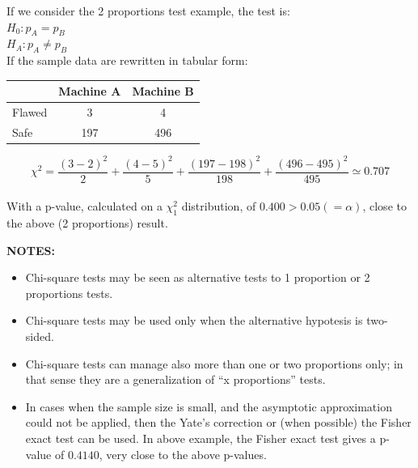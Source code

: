 \begin{frame}
  \vspace{.25cm}
  If we consider the 2 proportions test example, the test is:\\
  $H_0: p_A=p_B$\\
  $H_A: p_A\neq p_B$\\
  \vspace{.25cm}
  If the sample data are rewritten in tabular form:
  \begin{center}
  \begin{tabular}{l|c|c}
  & Machine A & Machine B\\
  \hline
  Flawed & 3 & 4\\
  Safe & 197 & 496\\
  \hline
  \end{tabular}
  \end{center}
  \vspace{.25cm}
  $$\chi^2=\dfrac{(3-2)^2}{2}+\dfrac{(4-5)^2}{5}+\dfrac{(197-198)^2}{198}+\dfrac{(496-495)^2}{495}\simeq 0.707$$\\
  With a p-value, calculated on a $\chi^2_1$ distribution, of $0.400 > 0.05 (=\alpha)$, close to the above (2 proportions) result.
\end{frame}


\begin{frame}
  \vspace{.25cm}
  \textbf{NOTES:}\\
  \vspace{.25cm}
  \begin{itemize}
   \item Chi-square tests may be seen as alternative tests to 1 proportion or 2 proportions tests.
   \item Chi-square tests may be used only when the alternative hypotesis is two-sided.
   \item Chi-square tests can manage also more than one or two proportions only; in that sense they are a generalization of ``x proportions'' tests.
   \item In cases when the sample size is small, and the asymptotic approximation could not be applied, then the Yate's correction or (when possible) the Fisher exact test can be used. In above example, the Fisher exact test gives a p-value of $0.4140$, very close to the above p-values.
  \end{itemize}


\end{frame}


